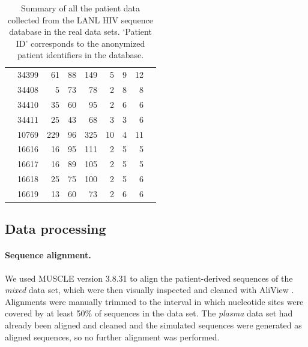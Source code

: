 \documentclass{bmcart}
\begin{document}
\begin{table}
\begin{center}
\begin{tabular}{llrrrrrrr}
& 34399 &      61 &       88 &      149 &        5 &        9 &       12 \\
& 34408 &       5 &       73 &       78 &        2 &        8 &        8 \\
& 34410 &      35 &       60 &       95 &        2 &        6 &        6 \\
& 34411 &      25 &       43 &       68 &        3 &        3 &        6   \\
\cite{Fischer04} & 10769 &    229 &       96 &      325 &       10 &        4 &       11 \\ 
\cite{Llewellyn06} & 16616 &     16 &       95 &      111 &        2 &        5 &        5 \\
& 16617 &     16 &       89 &      105 &        2 &        5 &        5 \\
& 16618 &     25 &       75 &      100 &        2 &        5 &        6 \\
& 16619 &     13 &       60 &       73 &        2 &        6 &        6 \\
\hline
\end{tabular}
\end{center}
  \caption{
  {Summary of all the patient data collected from the LANL HIV sequence database \cite{LosAlamos} in the real data sets.}
  `Patient ID' corresponds to the anonymized patient identifiers in the database.
   }\label{tab:patients} 
\end{table}


\subsection * {Data processing}

\paragraph{Sequence alignment.} \label{subsec:seqalign}
We used MUSCLE version 3.8.31 \cite{Muscle04} to align the patient-derived sequences of the \emph{mixed} data set, which were then visually inspected and cleaned with AliView \cite{AliView14}. 
Alignments were manually trimmed to the interval in which nucleotide sites were covered by at least 50\% of sequences in the data set.
The \emph{plasma} data set had already been aligned and cleaned \cite{McCloskey14} and the simulated sequences were generated as aligned sequences, so no further alignment was performed.
\end{document}
